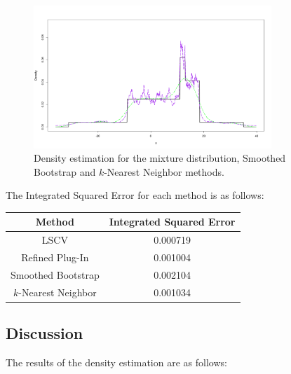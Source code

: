 \documentclass{article}
\begin{document}
\begin{figure}[H]
  \centering
  \includegraphics[width=0.8\textwidth]{density_estimation_comparison_p2.png}
  \caption{Density estimation for the mixture distribution, Smoothed Bootstrap and \(k\)-Nearest Neighbor methods.}
\end{figure}

The Integrated Squared Error for each method is as follows:

\begin{table}[H]
\centering
\begin{tabular}{|c|c|}
\hline
\textbf{Method} & \textbf{Integrated Squared Error} \\ \hline
LSCV & 0.000719 \\ \hline
Refined Plug-In & 0.001004 \\ \hline
Smoothed Bootstrap & 0.002104 \\ \hline
\(k\)-Nearest Neighbor & 0.001034 \\ \hline
\end{tabular}
\end{table}

\subsection{Discussion}

The results of the density estimation are as follows:
\end{document}

